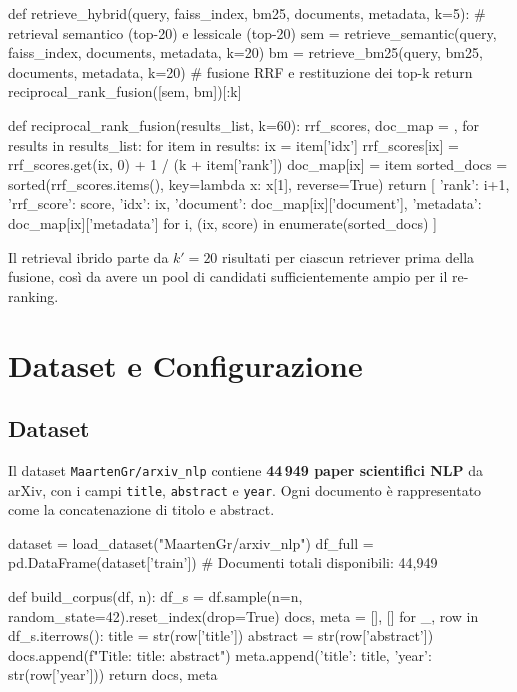 \documentclass[12pt,a4paper]{article}
\begin{document}
\begin{pylisting}[title={Funzione di retrieval ibrido con RRF}]
def retrieve_hybrid(query, faiss_index, bm25, documents, metadata, k=5):
    # retrieval semantico (top-20) e lessicale (top-20)
    sem = retrieve_semantic(query, faiss_index, documents, metadata, k=20)
    bm  = retrieve_bm25(query, bm25, documents, metadata, k=20)
    # fusione RRF e restituzione dei top-k
    return reciprocal_rank_fusion([sem, bm])[:k]

def reciprocal_rank_fusion(results_list, k=60):
    rrf_scores, doc_map = {}, {}
    for results in results_list:
        for item in results:
            ix = item['idx']
            rrf_scores[ix] = rrf_scores.get(ix, 0) + 1 / (k + item['rank'])
            doc_map[ix]    = item
    sorted_docs = sorted(rrf_scores.items(),
                         key=lambda x: x[1], reverse=True)
    return [
        {'rank': i+1, 'rrf_score': score, 'idx': ix,
         'document': doc_map[ix]['document'],
         'metadata': doc_map[ix]['metadata']}
        for i, (ix, score) in enumerate(sorted_docs)
    ]
\end{pylisting}

Il retrieval ibrido parte da $k'=20$ risultati per ciascun retriever prima della fusione, cos\`i da avere un pool di candidati sufficientemente ampio per il re-ranking.

\section{Dataset e Configurazione}

\subsection{Dataset}

Il dataset \texttt{MaartenGr/arxiv\_nlp} contiene \textbf{44\,949 paper scientifici NLP} da arXiv, con i campi \texttt{title}, \texttt{abstract} e \texttt{year}. Ogni documento \`e rappresentato come la concatenazione di titolo e abstract.

\begin{pylisting}[title={Caricamento e costruzione del corpus}]
dataset = load_dataset("MaartenGr/arxiv_nlp")
df_full = pd.DataFrame(dataset['train'])
# Documenti totali disponibili: 44,949

def build_corpus(df, n):
    df_s = df.sample(n=n, random_state=42).reset_index(drop=True)
    docs, meta = [], []
    for _, row in df_s.iterrows():
        title    = str(row['title'])
        abstract = str(row['abstract'])
        docs.append(f"Title: {title}\n\nAbstract: {abstract}")
        meta.append({'title': title, 'year': str(row['year'])})
    return docs, meta
\end{pylisting}
\end{document}

